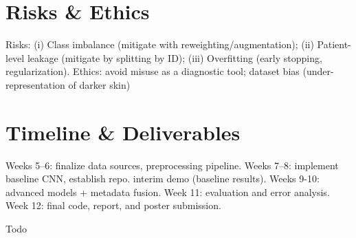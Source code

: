 \documentclass[11pt]{article}
\begin{document}
	\section*{Risks \& Ethics}
	Risks: (i) Class imbalance (mitigate with reweighting/augmentation); (ii) Patient-level leakage (mitigate by splitting by ID); (iii) Overfitting (early stopping, regularization). Ethics: avoid misuse as a diagnostic tool; dataset bias (under-representation of darker skin)
	
	\section*{Timeline \& Deliverables}
	Weeks 5–6: finalize data sources, preprocessing pipeline.  
	Weeks 7–8: implement baseline CNN, establish repo. interim demo (baseline results).  
	Weeks 9-10: advanced models + metadata fusion.  
	Week 11: evaluation and error analysis.  
	Week 12: final code, report, and poster submission.
	
	
	\begin{thebibliography}{9}
		Todo
	\end{thebibliography}
	
\end{document}

